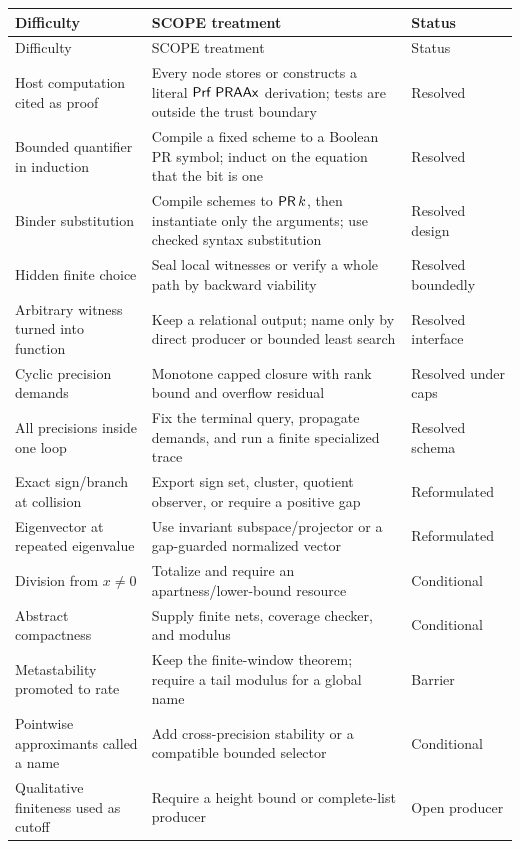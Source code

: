 \small
\begin{longtable}{@{}p{}p{}p{}@{}}
\toprule
Difficulty & SCOPE treatment & Status \\
\midrule
\endfirsthead
\toprule
Difficulty & SCOPE treatment & Status \\
\midrule
\endhead
Host computation cited as proof & Every node stores or constructs a literal
\(\mathsf{Prf}\;\mathsf{PRAAx}\) derivation; tests are outside the trust boundary & Resolved \\
Bounded quantifier in induction & Compile a fixed scheme to a Boolean PR symbol;
induct on the equation that the bit is one & Resolved \\
Binder substitution & Compile schemes to \(\mathsf{PR}\,k\), then instantiate only the
arguments; use checked syntax substitution & Resolved design \\
Hidden finite choice & Seal local witnesses or verify a whole path by backward
viability & Resolved boundedly \\
Arbitrary witness turned into function & Keep a relational output; name only by
direct producer or bounded least search & Resolved interface \\
Cyclic precision demands & Monotone capped closure with rank bound and overflow
residual & Resolved under caps \\
All precisions inside one loop & Fix the terminal query, propagate demands, and
run a finite specialized trace & Resolved schema \\
Exact sign/branch at collision & Export sign set, cluster, quotient observer, or
require a positive gap & Reformulated \\
Eigenvector at repeated eigenvalue & Use invariant subspace/projector or a
gap-guarded normalized vector & Reformulated \\
Division from \(x\neq0\) & Totalize and require an apartness/lower-bound resource & Conditional \\
Abstract compactness & Supply finite nets, coverage checker, and modulus & Conditional \\
Metastability promoted to rate & Keep the finite-window theorem; require a tail
modulus for a global name & Barrier \\
Pointwise approximants called a name & Add cross-precision stability or a
compatible bounded selector & Conditional \\
Qualitative finiteness used as cutoff & Require a height bound or complete-list
producer & Open producer \\

\end{longtable}
